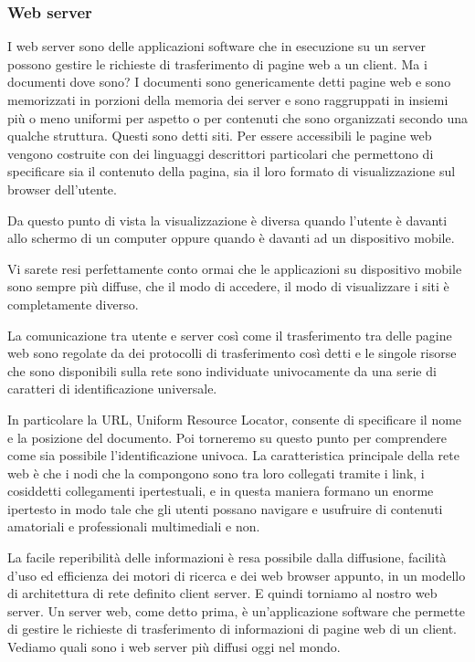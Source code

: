 \subsubsection{Web server}
I web server sono delle applicazioni software che in esecuzione su un server possono gestire le richieste di trasferimento di pagine web a un client. Ma i documenti dove sono? I documenti sono genericamente detti pagine web e sono memorizzati in porzioni della memoria dei server e sono raggruppati in insiemi più o meno uniformi per aspetto o per contenuti che sono organizzati secondo una qualche struttura. Questi sono detti siti. Per essere accessibili le pagine web vengono costruite con dei linguaggi descrittori particolari che permettono di specificare sia il contenuto della pagina, sia il loro formato di visualizzazione sul browser dell'utente.  \par
Da questo punto di vista la visualizzazione è diversa quando l'utente è davanti allo schermo di un computer oppure quando è davanti ad un dispositivo mobile.\par
Vi sarete resi perfettamente conto ormai che le applicazioni su dispositivo mobile sono sempre più diffuse, che il modo di accedere, il modo di visualizzare i siti è completamente diverso.\par
La comunicazione tra utente e server così come il trasferimento tra delle pagine web sono regolate da dei protocolli di trasferimento così detti e le singole risorse che sono disponibili sulla rete sono individuate univocamente da una serie di caratteri di identificazione universale. \par
In particolare la URL, Uniform Resource Locator, consente di specificare il nome e la posizione del documento. Poi torneremo su questo punto per comprendere come sia possibile l'identificazione univoca. La caratteristica principale della rete web è che i nodi che la compongono sono tra loro collegati tramite i link, i cosiddetti collegamenti ipertestuali, e in questa maniera formano un enorme ipertesto in modo tale che gli utenti possano navigare e usufruire di contenuti amatoriali e professionali multimediali e non.\par
La facile reperibilità delle informazioni è resa possibile dalla diffusione, facilità d'uso ed efficienza dei motori di ricerca e dei web browser appunto, in un modello di architettura di rete definito client server. E quindi torniamo al nostro web server. Un server web, come detto prima, è un'applicazione software che permette di gestire le richieste di trasferimento di informazioni di pagine web di un client. Vediamo quali sono i web server più diffusi oggi nel mondo.

